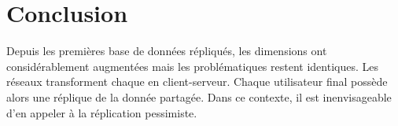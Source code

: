 \section{Conclusion}

Depuis les premières base de données répliqués, les dimensions ont
considérablement augmentées mais les problématiques restent identiques. Les
réseaux  transforment chaque  en
client-serveur. Chaque utilisateur final possède alors une réplique de la donnée
partagée. Dans ce contexte, il est inenvisageable d'en appeler à la réplication
pessimiste. 

